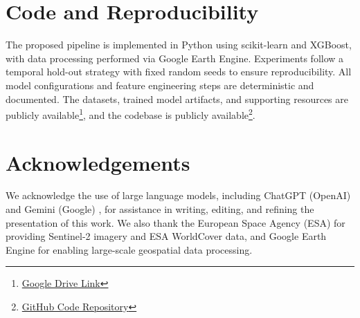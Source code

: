 \documentclass[11pt]{article}
\begin{document}
\section*{Code and Reproducibility}
The proposed pipeline is implemented in Python using scikit-learn and XGBoost, with data processing performed via Google Earth Engine. Experiments follow a temporal hold-out strategy with fixed random seeds to ensure reproducibility. All model configurations and feature engineering steps are deterministic and documented. The datasets, trained model artifacts, and supporting resources are publicly available\footnote{\href{https://drive.google.com/drive/u/3/folders/10M3mDetJYfQdM5GE7GPRY6Q_9u-eyJZJ}{Google Drive Link}}, and the codebase is publicly available\footnote{\href{https://github.com/mac-edmondson/machine-learning-final-project-ws2025}{GitHub Code Repository}}.

\section*{Acknowledgements}

We acknowledge the use of large language models, including ChatGPT (OpenAI) \citep{chatgpt2025} and Gemini (Google) \citep{gemini2025}, for assistance in writing, editing, and refining the presentation of this work. We also thank the European Space Agency (ESA) for providing Sentinel-2 imagery and ESA WorldCover data, and Google Earth Engine for enabling large-scale geospatial data processing.






\end{document}
